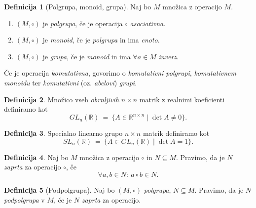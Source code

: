 \documentclass[11pt]{article}
\newcommand{\R}{\mathbb{R}}
\newcommand{\0}{\mathbf{0}}
\newcommand{\M}{M}
\newcommand{\NN}{N}
\theoremstyle{definition}
\newtheorem{definicija}{Definicija}[section]
\theoremstyle{definition}
\theoremstyle{definition}
\theoremstyle{definition}
\begin{document}
\begin{definicija}[Polgrupa, monoid, grupa]

Naj bo $\M$ množica z operacijo $\M$.
\begin{enumerate}
	\item $(M, \circ)$ je \textit{polgrupa}, če je operacija $\circ$ \textit{asociativna}.
	\item $(M, \circ)$ je \textit{monoid}, če je \textit{polgrupa} in ima \textit{enoto}.
	\item $(M, \circ)$ je \textit{grupa}, če je \textit{monoid} in ima $\forall a \in \M$ \textit{inverz}.
\end{enumerate}
Če je operacija \textit{komutativna}, govorimo o \textit{komutativni polgrupi}, \textit{komutativnem monoidu} ter \textit{komutativni} (oz. \textit{abelovi}) \textit{grupi}.

\end{definicija}
\vspace{0.5cm}

\begin{definicija}

Množico vseh \textit{obrnljivih} $n \times n$ matrik z realnimi koeficienti definiramo kot
$$\mathit{GL}_n(\R) ~=~ \{A \in \R^{n \times n} \mid \det A \neq 0\}.$$

\end{definicija}
\vspace{0.5cm}

\begin{definicija}

Specialno linearno grupo $n \times n$ matrik definiramo kot
$$\mathit{SL}_n(\R) ~=~ \{A \in \mathit{GL}_n(\R) \mid \det A = 1\}.$$

\end{definicija}
\vspace{0.5cm}

\begin{definicija}

Naj bo $\M$ množica z operacijo $\circ$ in $\NN \subseteq \M.$ Pravimo, da je $\NN$ \textit{zaprta} za operacijo $\circ$, če 
$$\forall a, b \in \NN: ~a \circ b \in \NN.$$

\end{definicija}
\vspace{0.5cm}

\begin{definicija}[Podpolgrupa]

Naj bo $(\M, \circ)$ \textit{polgrupa}, $\NN \subseteq \M$. Pravimo, da je $\NN$ \textit{podpolgrupa} v $\M$, če je $\NN$ \textit{zaprta} za operacijo.

\end{definicija}
\vspace{0.5cm}
\end{document}
